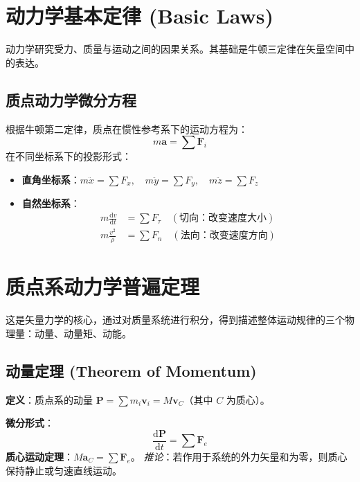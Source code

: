 \documentclass[12pt,a4paper]{article}
\newcommand{\vect}[1]{\mathbf{#1}}                   %
\newcommand{\der}[2]{\frac{\mathrm{d} #1}{\mathrm{d} #2}}  %
\begin{document}
\section{动力学基本定律 (Basic Laws)}

动力学研究受力、质量与运动之间的因果关系。其基础是牛顿三定律在矢量空间中的表达。

\subsection{质点动力学微分方程}
根据牛顿第二定律，质点在惯性参考系下的运动方程为：
\begin{equation}
    m \vect{a} = \sum \vect{F}_i
\end{equation}
在不同坐标系下的投影形式：
\begin{itemize}
    \item \textbf{直角坐标系}：$m\ddot{x} = \sum F_x, \quad m\ddot{y} = \sum F_y, \quad m\ddot{z} = \sum F_z$
    \item \textbf{自然坐标系}：
    \begin{align}
        m \der{v}{t} &= \sum F_{\tau} \quad (\text{切向：改变速度大小}) \\
        m \frac{v^2}{\rho} &= \sum F_n \quad (\text{法向：改变速度方向})
    \end{align}
\end{itemize}

\section{质点系动力学普遍定理}

这是矢量力学的核心，通过对质量系统进行积分，得到描述整体运动规律的三个物理量：动量、动量矩、动能。

\subsection{动量定理 (Theorem of Momentum)}
\textbf{定义}：质点系的动量 $\vect{P} = \sum m_i \vect{v}_i = M \vect{v}_C$（其中 $C$ 为质心）。

\textbf{微分形式}：
\begin{equation}
    \der{\vect{P}}{t} = \sum \vect{F}_e
\end{equation}
\textbf{质心运动定理}：$M \vect{a}_C = \sum \vect{F}_e$。
\textit{推论}：若作用于系统的外力矢量和为零，则质心保持静止或匀速直线运动。
\end{document}
